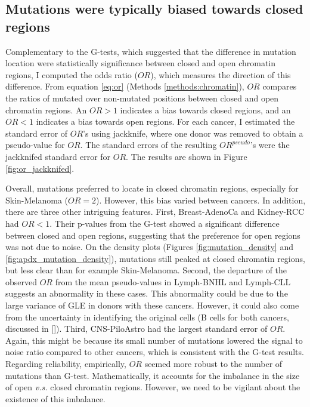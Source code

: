 

\subsection{Mutations were typically biased towards closed regions}\label{gle:or}
Complementary to the G-tests, which suggested that the difference in mutation location were statistically significance between closed and open chromatin regions, I computed the odds ratio ($OR$), which measures the direction of this difference. From equation \ref{eq:or} (Methods \ref{methods:chromatin}), $OR$ compares the ratios of mutated over non-mutated positions between closed and open chromatin regions. An $OR>1$ indicates a bias towards closed regions, and an $OR<1$ indicates a bias towards open regions. For each cancer, I estimated the standard error of $OR$'s using jackknife, where one donor was removed to obtain a pseudo-value for $OR$. The standard errors of the resulting $OR^{pseudo}$'s were the jackknifed standard error for $OR$. The results are shown in Figure \ref{fig:or_jackknifed}.



Overall, mutations preferred to locate in closed chromatin regions, especially for Skin-Melanoma ($OR=2$). However, this bias varied between cancers. In addition, there are three other intriguing features. First, Breast-AdenoCa and Kidney-RCC had $OR<1$. Their p-values from the G-test showed a significant difference between closed and open regions, suggesting that the preference for open regions was not due to noise. On the density plots (Figures \ref{fig:mutation_density} and \ref{fig:apdx_mutation_density}), mutations still peaked at closed chromatin regions, but less clear than for example Skin-Melanoma. Second, the departure of the observed $OR$ from the mean pseudo-values in Lymph-BNHL and Lymph-CLL suggests an abnormality in these cases. This abnormality could be due to the large variance of GLE in donors with these cancers. However, it could also come from the uncertainty in identifying the original cells (B cells for both cancers, discussed in \ref{}). Third, CNS-PiloAstro had the largest standard error of $OR$. Again, this might be because its small number of mutations lowered the signal to noise ratio compared to other cancers, which is consistent with the G-test results. Regarding reliability, empirically, $OR$ seemed more robust to the number of mutations than G-test. Mathematically, it accounts for the imbalance in the size of open \textit{v.s.} closed chromatin regions. However, we need to be vigilant about the existence of this imbalance.

